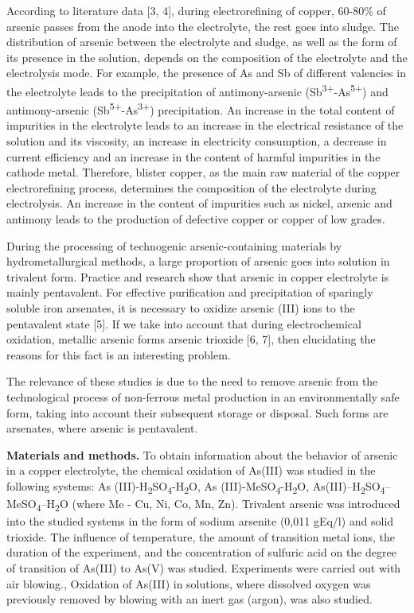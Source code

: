 According to literature data {[}3, 4{]}, during electrorefining of
copper, 60-80\% of arsenic passes from the anode into the electrolyte,
the rest goes into sludge. The distribution of arsenic between the
electrolyte and sludge, as well as the form of its presence in the
solution, depends on the composition of the electrolyte and the
electrolysis mode. For example, the presence of As and Sb of different
valencies in the electrolyte leads to the precipitation of
antimony-arsenic (Sb\textsuperscript{3+}-As\textsuperscript{5+}) and
antimony-arsenic (Sb\textsuperscript{5+}-As\textsuperscript{3+})
precipitation. An increase in the total content of impurities in the
electrolyte leads to an increase in the electrical resistance of the
solution and its viscosity, an increase in electricity consumption, a
decrease in current efficiency and an increase in the content of harmful
impurities in the cathode metal. Therefore, blister copper, as the main
raw material of the copper electrorefining process, determines the
composition of the electrolyte during electrolysis. An increase in the
content of impurities such as nickel, arsenic and antimony leads to the
production of defective copper or copper of low grades.

During the processing of technogenic arsenic-containing materials by
hydrometallurgical methods, a large proportion of arsenic goes into
solution in trivalent form. Practice and research show that arsenic in
copper electrolyte is mainly pentavalent. For effective purification and
precipitation of sparingly soluble iron arsenates, it is necessary to
oxidize arsenic (III) ions to the pentavalent state {[}5{]}. If we take
into account that during electrochemical oxidation, metallic arsenic
forms arsenic trioxide {[}6, 7{]}, then elucidating the reasons for this
fact is an interesting problem.

The relevance of these studies is due to the need to remove arsenic from
the technological process of non-ferrous metal production in an
environmentally safe form, taking into account their subsequent storage
or disposal. Such forms are arsenates, where arsenic is pentavalent.

{\bfseries Materials and methods.} To obtain information about the behavior
of arsenic in a copper electrolyte, the chemical oxidation of As(III)
was studied in the following systems: As
(III)-H\textsubscript{2}SO\textsubscript{4}-H\textsubscript{2}O, As
(III)-MeSO\textsubscript{4}-H\textsubscript{2}O,
As(III)--H\textsubscript{2}SO\textsubscript{4}--MeSO\textsubscript{4}--H\textsubscript{2}O
(where Me - Cu, Ni, Co, Mn, Zn). Trivalent arsenic was introduced into
the studied systems in the form of sodium arsenite (0,011 gEq/l) and
solid trioxide. The influence of temperature, the amount of transition
metal ions, the duration of the experiment, and the concentration of
sulfuric acid on the degree of transition of As(III) to As(V) was
studied. Experiments were carried out with air blowing., Oxidation of
As(III) in solutions, where dissolved oxygen was previously removed by
blowing with an inert gas (argon), was also studied.

